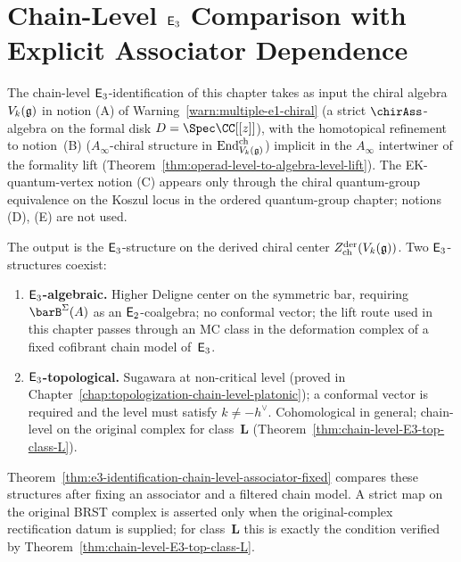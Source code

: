 \chapter{Chain-Level $\mathsf{E}_3$ Comparison with Explicit Associator Dependence}
\label{chap:e3-identification-chain-level-platonic}

\begin{remark}
\label{rem:e3-id-platonic-ap-conformance}
The chain-level $\mathsf{E}_3$-identification of this chapter takes as
input the chiral algebra $V_k(\mathfrak{g})$ in notion \textup{(A)} of
Warning~\ref{warn:multiple-e1-chiral} (a strict $\chirAss$-algebra
on the formal disk $D = \Spec\CC[[z]]$), with the homotopical
refinement to notion~\textup{(B)} ($A_\infty$-chiral structure in
$\operatorname{End}^{\mathrm{ch}}_{V_k(\mathfrak{g})}$) implicit in the $A_\infty$
intertwiner of the formality lift
(Theorem~\ref{thm:operad-level-to-algebra-level-lift}). The
EK-quantum-vertex notion \textup{(C)} appears only through the
chiral quantum-group equivalence on the Koszul locus
in the ordered quantum-group chapter; notions \textup{(D)},
\textup{(E)} are not used.

The output is the $\mathsf{E}_3$-structure on the derived chiral
center $Z^{\mathrm{der}}_{\mathrm{ch}}(V_k(\mathfrak{g}))$. Two
$\mathsf{E}_3$-structures coexist:

\begin{enumerate}[label=\textup{(\Alph*)}]
\item \textbf{$\mathsf{E}_3$-algebraic.} Higher Deligne center on the
 symmetric bar, requiring $\barB^{\Sigma}(A)$ as an
 $\mathsf{E}_2$-coalgebra; no conformal vector; the lift route
 used in this chapter passes through an MC class in the
 deformation complex of a fixed cofibrant chain model of~$\mathsf{E}_3$.
\item \textbf{$\mathsf{E}_3$-topological.} Sugawara at non-critical
 level (proved in
 Chapter~\ref{chap:topologization-chain-level-platonic}); a
 conformal vector is required and the level must satisfy
 $k\ne -h^\vee$. Cohomological in general; chain-level on the
 original complex for class~$\mathbf{L}$
 (Theorem~\ref{thm:chain-level-E3-top-class-L}).
\end{enumerate}
Theorem~\ref{thm:e3-identification-chain-level-associator-fixed}
compares these structures after fixing an associator and a filtered
chain model. A strict map on the original BRST complex is asserted
only when the original-complex rectification datum is supplied; for
class~$\mathbf{L}$ this is exactly the condition verified by
Theorem~\ref{thm:chain-level-E3-top-class-L}.
\end{remark}

